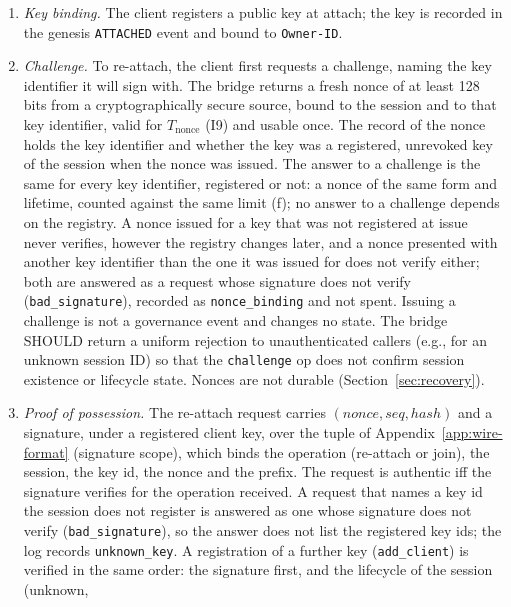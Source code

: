 \begin{invariant}\label{inv:I11}
\begin{enumerate}[leftmargin=2em,label=(\alph*)]
\item \emph{Key binding.} The client registers a public key at attach;
the key is recorded in the genesis \texttt{ATTACHED} event and bound to
\texttt{Owner-ID}.
\item \emph{Challenge.} To re-attach, the client first requests a
challenge, naming the key identifier it will sign with. The bridge
returns a fresh nonce of at least 128 bits from a
cryptographically secure source, bound to the session and to that key
identifier, valid for $T_{\text{nonce}}$ (I9) and usable once. The record of
the nonce holds the key identifier and whether the key was a registered,
unrevoked key of the session when the nonce was issued. The answer to a
challenge is the same for every key identifier, registered or not: a nonce of
the same form and lifetime, counted against the same limit (f); no answer to
a challenge depends on the registry. A nonce issued for a key that was not
registered at issue never verifies, however the registry changes later, and a
nonce presented with another key identifier than the one it was issued for
does not verify either; both are answered as a request whose signature does
not verify (\texttt{bad\_signature}), recorded as \texttt{nonce\_binding} and
not spent. Issuing a challenge is not a
governance event and changes no state. The bridge SHOULD return a uniform rejection
to unauthenticated callers (e.g., for an unknown session ID) so
that the \texttt{challenge} op does not confirm session existence
or lifecycle state. Nonces are not durable (Section~\ref{sec:recovery}).
\item \emph{Proof of possession.} The re-attach request carries
$(\mathit{nonce}, \mathit{seq}, \mathit{hash})$ and a signature, under
a registered client key, over the tuple of Appendix~\ref{app:wire-format}
(signature scope), which binds the operation (re-attach or join), the
session, the key id, the nonce and the prefix. The request is authentic
iff the signature verifies for the operation received. A request that
names a key id the session does not register is answered as one whose
signature does not verify (\texttt{bad\_signature}), so the answer does not
list the registered key ids; the log records \texttt{unknown\_key}. A
registration of a further key (\texttt{add\_client}) is verified in the same
order: the signature first, and the lifecycle of the session (unknown,

\end{enumerate}
\end{invariant}
